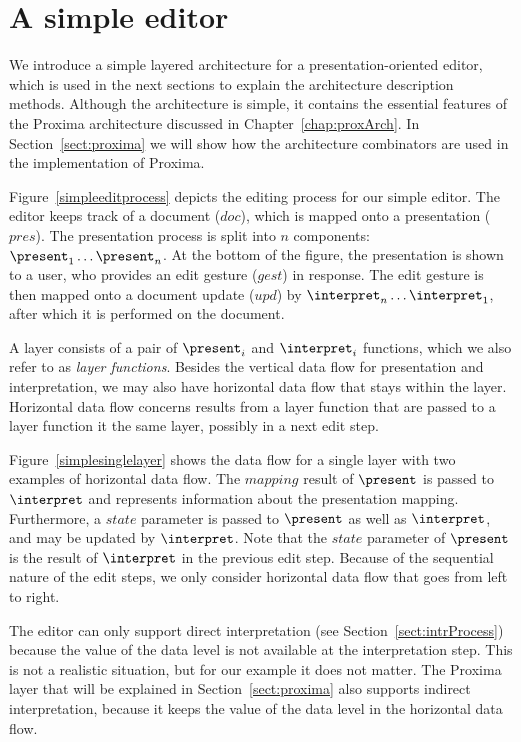 \documentclass[preprint,natbib]{sigplanconf}
\begin{document}
\section{A simple editor}


We introduce a simple layered architecture for a presentation-oriented editor, which is used in the next sections to explain the architecture description methods. Although the architecture is simple, it contains the essential features of the Proxima architecture discussed in Chapter~\ref{chap:proxArch}. In Section~\ref{sect:proxima} we will show how the architecture combinators are used in the implementation of Proxima.

Figure~\ref{simpleeditprocess} depicts the editing process for our simple editor. The editor keeps track of a document ($doc$), which is mapped onto a presentation ($pres$). The presentation process is split into $n$ components: $\present_1 \dots \present_n$. At the bottom of the figure, the presentation is shown to a user, who provides an edit gesture ($gest$) in response. The edit gesture is then mapped onto a document update ($upd$) by $\interpret_n \dots \interpret_1$, after which it is performed on the document.


A layer consists of a pair of $\present_i$ and $\interpret_i$ functions, which we also refer to as {\em layer functions}. Besides the vertical data flow for presentation and interpretation, we may also have horizontal data flow that stays within the layer. Horizontal data flow concerns results from a layer function that are passed to a layer function it the same layer, possibly in a next edit step.

Figure~\ref{simplesinglelayer} shows the data flow for a single layer with two examples of horizontal data flow. The $mapping$ result of $\present$ is passed to $\interpret$ and represents information about the presentation mapping. Furthermore, a $state$ parameter is passed to $\present$ as well as $\interpret$, and may be updated by $\interpret$. Note that the $state$ parameter of $\present$ is the result of $\interpret$ in the previous edit step. Because of the sequential nature of the edit steps, we only consider horizontal data flow that goes from left to right.

The editor can only support direct interpretation (see Section~\ref{sect:intrProcess}) because the value of the data level is not available at the interpretation step. This is not a realistic situation, but for our example it does not matter. The Proxima layer that will be explained in Section~\ref{sect:proxima} also supports indirect interpretation, because it keeps the value of the data level in the horizontal data flow.
\end{document}
